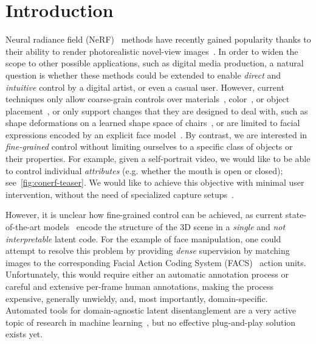\section{Introduction}
  \label{sec:conerf-intro}
  Neural radiance field (NeRF)~\cite{mildenhall2020nerf} methods have recently
  gained popularity thanks to their ability to render photorealistic
  novel-view images~\cite{martin2021nerf,
  park2020deformable,park2021hypernerf,zhang2020nerf++}.
  In order to widen the scope to other possible applications, such as digital
  media production, a natural question is whether these methods could be
  extended to enable \textit{direct} and \textit{intuitive} control by a
  digital artist, or even a casual user.
  However, current techniques only allow coarse-grain controls over
  materials~\cite{zhang2021nerfactor}, color~\cite{jang2021codenerf}, or
  object placement~\cite{yang2021learning}, or only support changes that they
  are designed to deal with, such as shape deformations on a learned shape
  space of chairs~\cite{liu2021editing}, or are limited to facial expressions
  encoded by an explicit face model~\cite{gafni2021dynamic}.
  By contrast, we are interested in \textit{fine-grained} control without
  limiting ourselves to a specific class of objects or their properties.
  For example, given a self-portrait video, we would like to be able to
  control individual \textit{attributes} (e.g. whether the mouth is open or
  closed); see~\cref{fig:conerf-teaser}.
  We would like to achieve this objective with minimal user intervention,
  without the need of specialized capture setups~\cite{liu2021neural}.

  However, it is unclear how fine-grained control can be achieved, as current
  state-of-the-art models~\cite{park2021hypernerf} encode the structure of the
  3D scene in a \textit{single} and \textit{not interpretable} latent code.
  For the example of face manipulation, one could attempt to resolve this
  problem by providing \textit{dense} supervision by matching images to the
  corresponding Facial Action Coding System (FACS)~\cite{facs} action units.
  Unfortunately, this would require either an automatic annotation process or
  careful and extensive per-frame human annotations, making the process
  expensive, generally unwieldy, and, most importantly, domain-specific.
  Automated tools for domain-agnostic latent disentanglement are a very active
  topic of research in machine learning~\cite{higgins2016beta,
  higgins2018towards, chen2016infogan}, but no effective plug-and-play
  solution exists yet.

